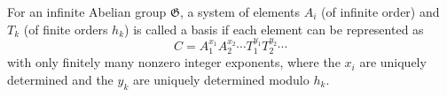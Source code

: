For an infinite Abelian group $\mathfrak{G}$, a system of elements $A_i$ (of infinite order) and $T_k$ (of finite orders $h_k$) is called a basis if each element can be represented as
$$C = A_1^{x_1}A_2^{x_2}\cdots T_1^{y_1}T_2^{y_2}\cdots$$
with only finitely many nonzero integer exponents, where the $x_i$ are uniquely determined and the $y_k$ are uniquely determined modulo $h_k$.
